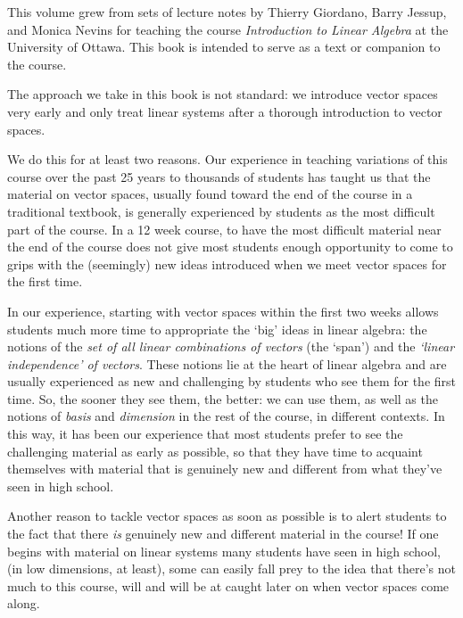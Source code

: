 %
%

\preface
{}

This volume grew from sets of lecture notes by Thierry Giordano, Barry Jessup,  and Monica Nevins for teaching the course \emph{Introduction to Linear Algebra} at the University of Ottawa.  This book is intended to serve as a text or companion to the course.


The approach we take in this book is not standard: we introduce vector spaces very early and only treat linear systems after a thorough introduction to  vector spaces. 

We do this for at least two reasons. Our experience in teaching variations of this course over the past 25 years  to thousands of students has taught us that the material on vector spaces, usually found toward the end of the course in a traditional textbook, is generally experienced by students as the most difficult part of the course. In a 12 week course, to have the most difficult material near the end of the course does not give most students enough opportunity to come to grips with the (seemingly) new ideas introduced when we meet vector spaces for the first time. 

In our experience, starting with  vector spaces within the first two weeks allows students much more time to appropriate the `big' ideas in linear algebra: the notions of the {\it set of all linear combinations of vectors} (the `span') and the {\it `linear independence' of vectors}. These notions lie at the heart of linear algebra and are usually experienced as new and challenging by students who see them for the first time. So, the sooner they see them, the better: we can use them, as well as the notions of {\it basis} and {\it dimension} in the rest of the course, in different contexts. In this way, it has been our experience that most students prefer to see the challenging material as early as possible, so that they have time to acquaint themselves with material that is genuinely new and different from what they've seen in high school.

Another reason to tackle vector spaces as soon as possible is to alert students to the fact that there {\it is} genuinely new and different material in the course! If one begins with material on linear systems many students have seen in high school, (in low dimensions, at least),  some can easily fall prey to the idea that there's not much to this course, will and will be at caught later on when vector spaces come along.
 


